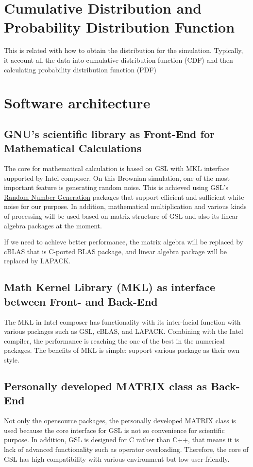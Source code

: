 \documentclass[10pt, a4paper]{article}
\begin{document}
\begin{appendices}
\section{Cumulative Distribution and Probability Distribution Function}
This is related with how to obtain the distribution for the simulation. Typically, it account all the data into cumulative distribution function (CDF) and then calculating probability distribution function (PDF) 

\section{Software architecture}\label{appen_software_architecture}
\subsection{GNU's scientific library as Front-End for Mathematical Calculations}
The core for mathematical calculation is based on GSL with MKL interface supported by Intel composer. On this Brownian simulation, one of the most important feature is generating random noise. This is achieved using GSL's \href{https://www.gnu.org/software/gsl/manual/html_node/Random-Number-Generation.html}{Random Number Generation} packages that support efficient and sufficient white noise for our purpose. In addition, mathematical multiplication and various kinds of processing will be used based on matrix structure of GSL and also its linear algebra packages at the moment.

If we need to achieve better performance, the matrix algebra will be replaced by cBLAS that is C-ported BLAS package, and linear algebra package will be replaced by LAPACK.

\subsection{Math Kernel Library (MKL) as interface between Front- and Back-End}
The MKL in Intel composer has functionality with its inter-facial function with various packages such as GSL, cBLAS, and LAPACK. Combining with the Intel compiler, the performance is reaching the one of the best in the numerical packages. The benefits of MKL is simple: support various package as their own style. 

\subsection{Personally developed MATRIX class as Back-End}
Not only the opensource packages, the personally developed MATRIX class is used because the core interface for GSL is not so convenience for scientific purpose. In addition, GSL is designed for C rather than C++, that means it is lack of advanced functionality such as operator overloading. Therefore, the core of GSL has high compatibility with various environment but low user-friendly. 


\end{appendices}
\end{document}
